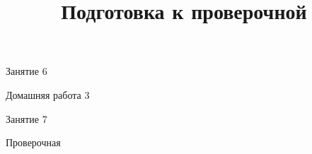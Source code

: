 \begin{class}[number=6]
	\begin{listofex}
		\item Занятие 6
	\end{listofex}
\end{class}

\begin{homework}[number=3]
	\begin{listofex}
		\item Домашняя работа 3
	\end{listofex}
\end{homework}

\begin{class}[number=7]
	\title{Подготовка к проверочной}
	\begin{listofex}
		\item Занятие 7
	\end{listofex}
\end{class}

\begin{exam}
	\begin{listofex}
		\item Проверочная
	\end{listofex}
\end{exam}

%	

